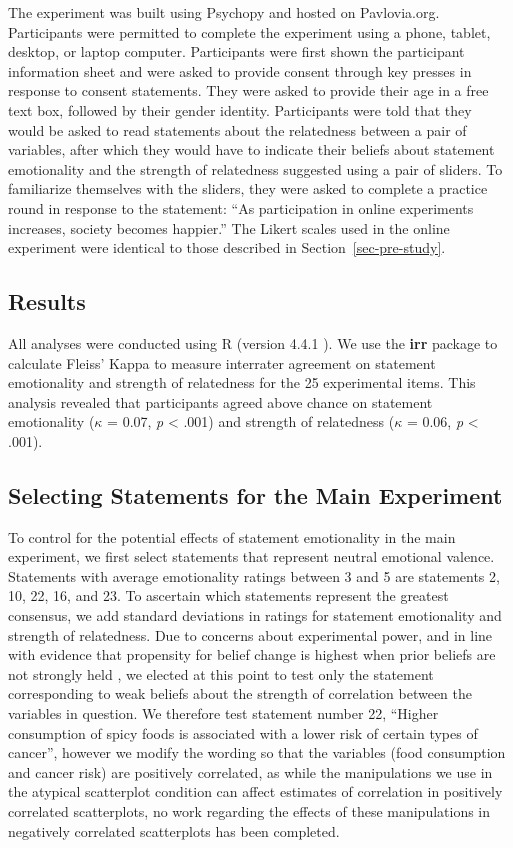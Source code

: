 \documentclass[manuscript,screen,review,anonymous]{acmart}
\begin{document}
The experiment was built using Psychopy \citep{pierce_2019} and hosted
on Pavlovia.org. Participants were permitted to complete the experiment
using a phone, tablet, desktop, or laptop computer. Participants were
first shown the participant information sheet and were asked to provide
consent through key presses in response to consent statements. They were
asked to provide their age in a free text box, followed by their gender
identity. Participants were told that they would be asked to read
statements about the relatedness between a pair of variables, after
which they would have to indicate their beliefs about statement
emotionality and the strength of relatedness suggested using a pair of
sliders. To familiarize themselves with the sliders, they were asked to
complete a practice round in response to the statement: ``As
participation in online experiments increases, society becomes
happier.'' The Likert scales used in the online experiment were
identical to those described in Section~\ref{sec-pre-study}.

\subsection{Results}\label{sec-results-pre}

All analyses were conducted using R (version 4.4.1 \citep{rcore}). We
use the \textbf{irr} package to calculate Fleiss' Kappa to measure
interrater agreement on statement emotionality and strength of
relatedness for the 25 experimental items. This analysis revealed that
participants agreed above chance on statement emotionality (\(\kappa\) =
0.07, \emph{p} \textless{} .001) and strength of relatedness (\(\kappa\)
= 0.06, \emph{p} \textless{} .001).

\subsection{Selecting Statements for the Main
Experiment}\label{sec-selecting-statements}

To control for the potential effects of statement emotionality in the
main experiment, we first select statements that represent neutral
emotional valence. Statements with average emotionality ratings between
3 and 5 are statements 2, 10, 22, 16, and 23. To ascertain which
statements represent the greatest consensus, we add standard deviations
in ratings for statement emotionality and strength of relatedness. Due
to concerns about experimental power, and in line with evidence that
propensity for belief change is highest when prior beliefs are not
strongly held \citep{xiong_2022, markant_2023}, we elected at this point
to test only the statement corresponding to weak beliefs about the
strength of correlation between the variables in question. We therefore
test statement number 22, ``Higher consumption of spicy foods is
associated with a lower risk of certain types of cancer'', however we
modify the wording so that the variables (food consumption and cancer
risk) are positively correlated, as while the manipulations we use in
the atypical scatterplot condition can affect estimates of correlation
in positively correlated scatterplots, no work regarding the effects of
these manipulations in negatively correlated scatterplots has been
completed.
\end{document}
